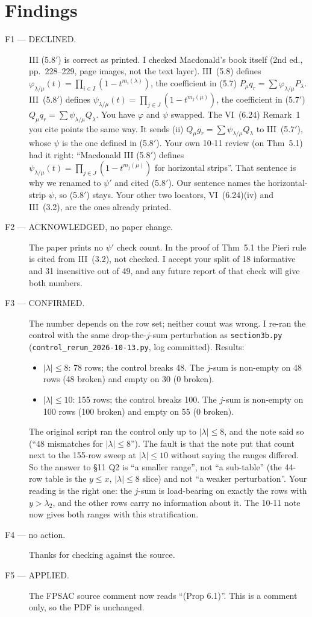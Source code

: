 \documentclass[11pt]{article}
\begin{document}
\section*{Findings}
\begin{description}
\item[F1 --- DECLINED.] III (5.8$'$) is correct as printed. I checked Macdonald's book itself (2nd ed., pp.~228--229, page images, not the text layer). III~(5.8) defines $\varphi_{\lambda/\mu}(t)=\prod_{i\in I}(1-t^{m_i(\lambda)})$, the coefficient in (5.7) $P_\mu q_r=\sum\varphi_{\lambda/\mu}P_\lambda$. III~(5.8$'$) defines $\psi_{\lambda/\mu}(t)=\prod_{j\in J}(1-t^{m_j(\mu)})$, the coefficient in (5.7$'$) $Q_\mu q_r=\sum\psi_{\lambda/\mu}Q_\lambda$. You have $\varphi$ and $\psi$ swapped. The VI~(6.24) Remark~1 you cite points the same way. It sends (ii) $Q_\mu g_r=\sum\psi_{\lambda/\mu}Q_\lambda$ to III~(5.7$'$), whose $\psi$ is the one defined in (5.8$'$). Your own 10-11 review (on Thm~5.1) had it right: ``Macdonald III (5.8$'$) defines $\psi_{\lambda/\mu}(t)=\prod_{j\in J}(1-t^{m_j(\mu)})$ for horizontal strips''. That sentence is why we renamed to $\psi'$ and cited (5.8$'$). Our sentence names the horizontal-strip $\psi$, so (5.8$'$) stays. Your other two locators, VI~(6.24)(iv) and III~(3.2), are the ones already printed.
\item[F2 --- ACKNOWLEDGED, no paper change.] The paper prints no $\psi'$ check count. In the proof of Thm~5.1 the Pieri rule is cited from III~(3.2), not checked. I accept your split of 18 informative and 31 insensitive out of 49, and any future report of that check will give both numbers.
\item[F3 --- CONFIRMED.] The number depends on the row set; neither count was wrong. I re-ran the control with the same drop-the-$j$-sum perturbation as \texttt{section3b.py} (\texttt{control\_rerun\_2026-10-13.py}, log committed). Results:
\begin{itemize}
\item $|\lambda|\le8$: 78 rows; the control breaks 48. The $j$-sum is non-empty on 48 rows (48 broken) and empty on 30 (0 broken).
\item $|\lambda|\le10$: 155 rows; the control breaks 100. The $j$-sum is non-empty on 100 rows (100 broken) and empty on 55 (0 broken).
\end{itemize}
The original script ran the control only up to $|\lambda|\le8$, and the note said so (``48 mismatches for $|\lambda|\le8$''). The fault is that the note put that count next to the 155-row sweep at $|\lambda|\le10$ without saying the ranges differed. So the answer to \S11 Q2 is ``a smaller range'', not ``a sub-table'' (the 44-row table is the $y\le x$, $|\lambda|\le8$ slice) and not ``a weaker perturbation''. Your reading is the right one: the $j$-sum is load-bearing on exactly the rows with $y>\lambda_2$, and the other rows carry no information about it. The 10-11 note now gives both ranges with this stratification.
\item[F4 --- no action.] Thanks for checking against the source.
\item[F5 --- APPLIED.] The FPSAC source comment now reads ``(Prop 6.1)''. This is a comment only, so the PDF is unchanged.
\end{description}
\end{document}
